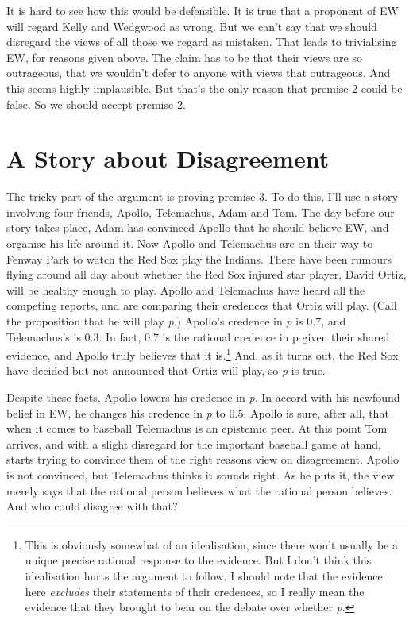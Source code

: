 \documentclass[
  10pt,
  letterpaper,
  DIV=11,
  numbers=noendperiod,
  twoside]{scrartcl}
\begin{document}
It is hard to see how this would be defensible. It is true that a
proponent of EW will regard Kelly and Wedgwood as wrong. But we can't
say that we should disregard the views of all those we regard as
mistaken. That leads to trivialising EW, for reasons given above. The
claim has to be that their views are so outrageous, that we wouldn't
defer to anyone with views that outrageous. And this seems highly
implausible. But that's the only reason that premise 2 could be false.
So we should accept premise 2.

\section{A Story about Disagreement}\label{a-story-about-disagreement}

The tricky part of the argument is proving premise 3. To do this, I'll
use a story involving four friends, Apollo, Telemachus, Adam and Tom.
The day before our story takes place, Adam has convinced Apollo that he
should believe EW, and organise his life around it. Now Apollo and
Telemachus are on their way to Fenway Park to watch the Red Sox play the
Indians. There have been rumours flying around all day about whether the
Red Sox injured star player, David Ortiz, will be healthy enough to
play. Apollo and Telemachus have heard all the competing reports, and
are comparing their credences that Ortiz will play. (Call the
proposition that he will play \emph{p}.) Apollo's credence in \emph{p}
is 0.7, and Telemachus's is 0.3. In fact, 0.7 is the rational credence
in p given their shared evidence, and Apollo truly believes that it
is.\footnote{This is obviously somewhat of an idealisation, since there
  won't usually be a unique precise rational response to the evidence.
  But I don't think this idealisation hurts the argument to follow. I
  should note that the evidence here \emph{excludes} their statements of
  their credences, so I really mean the evidence that they brought to
  bear on the debate over whether \emph{p}.} And, as it turns out, the
Red Sox have decided but not announced that Ortiz will play, so \emph{p}
is true.

Despite these facts, Apollo lowers his credence in \emph{p}. In accord
with his newfound belief in EW, he changes his credence in \emph{p} to
0.5. Apollo is sure, after all, that when it comes to baseball
Telemachus is an epistemic peer. At this point Tom arrives, and with a
slight disregard for the important baseball game at hand, starts trying
to convince them of the right reasons view on disagreement. Apollo is
not convinced, but Telemachus thinks it sounds right. As he puts it, the
view merely says that the rational person believes what the rational
person believes. And who could disagree with that?
\end{document}
